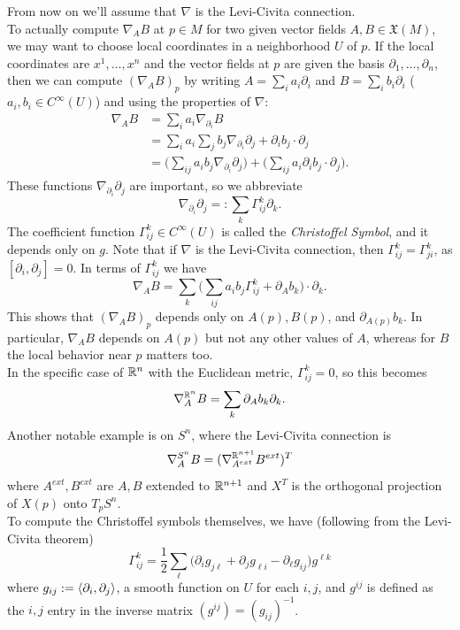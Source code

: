 \documentclass{amsart}
\renewcommand{\X}{\mathfrak{X}}
\begin{document}
	From now on we'll assume that $\nabla$ is the Levi-Civita connection.\\
	
	To actually compute $\nabla_A B$ at $p\in M$ for two given vector fields $A,B\in \X(M)$, we may want to choose local coordinates in a neighborhood $U$ of $p$. If the local coordinates are $x^1,\dots,x^n$ and the vector fields at $p$ are given the basis $\partial_1,\dots,\partial_n$, then we can compute $(\nabla_AB)_p$ by writing $A = \sum_i a_i \partial_i$ and $B=\sum_i b_i\partial_i$ ($a_i,b_i\in C^{\infty}(U)$) and using the properties of $\nabla$:
	\begin{align*}
		\nabla_AB &= \sum_i a_i \nabla_{\partial_i} B\\
		&= \sum_i a_i \sum_j b_j\nabla_{\partial_i}\partial_j + \partial_i b_j \cdot \partial_j\\
		&= \bigg(\sum_{ij} a_ib_j \nabla_{\partial_i}\partial_j\bigg) + \bigg(\sum_{ij} a_i \partial_ib_j\cdot \partial_j \bigg).
	\end{align*}
	These functions $\nabla_{\partial_i}\partial_j$ are important, so we abbreviate
	$$
	\nabla_{\partial_i}\partial_j =: \sum_k \Gamma^k_{ij} \partial_k.
	$$
	The coefficient function $\Gamma^k_{ij}\in C^{\infty}(U)$ is called the \textit{Christoffel Symbol}, and it depends only on $g$. Note that if $\nabla$ is the Levi-Civita connection, then $\Gamma^k_{ij}=\Gamma^k_{ji}$, as $[\partial_i,\partial_j]=0$. In terms of $\Gamma^k_{ij}$ we have 
	$$
	\nabla_{A}B = \sum_k \bigg(\sum_{ij} a_ib_j \Gamma^k_{ij} + \partial_A b_k\bigg)\cdot \partial_k.
	$$
	This shows that $(\nabla_A B)_p$ depends only on $A(p),B(p)$, and $\partial_{A(p)} b_k$. In particular, $\nabla_A B$ depends on $A(p)$ but not any other values of $A$, whereas for $B$ the local behavior near $p$ matters too.\\
	
	In the specific case of $\mathbb{R}^n$ with the Euclidean metric, $\Gamma^k_{ij}=0$, so this becomes
	$$
	\nabla^{\mathbb{R}^n}_AB = \sum_k \partial_A b_k \partial_k.
	$$
	Another notable example is on $S^n$, where the Levi-Civita connection is 
	$$
	\nabla^{S^n}_AB = (\nabla^{\mathbb{R}^{n+1}}_{A^{ext}}B^{ext})^T
	$$
	where $A^{ext},B^{ext}$ are $A,B$ extended to $\mathbb{R}^{n+1}$ and $X^T$ is the orthogonal projection of $X(p)$ onto $T_pS^n$.\\
	
	To compute the Christoffel symbols themselves, we have (following from the Levi-Civita theorem)
	$$
	\Gamma_{ij}^k = \frac12 \sum_{\ell} \Big(\partial_i g_{j\ell} + \partial_j g_{\ell i} - \partial_{\ell} g_{ij}\Big)g^{\ell k}
	$$
	where $g_{ij} := \langle\partial_i,\partial_j\rangle$, a smooth function on $U$ for each $i,j$, and $g^{ij}$ is defined as the $i,j$ entry in the inverse matrix $(g^{ij})=(g_{ij})^{-1}$.\\
	
\end{document}
